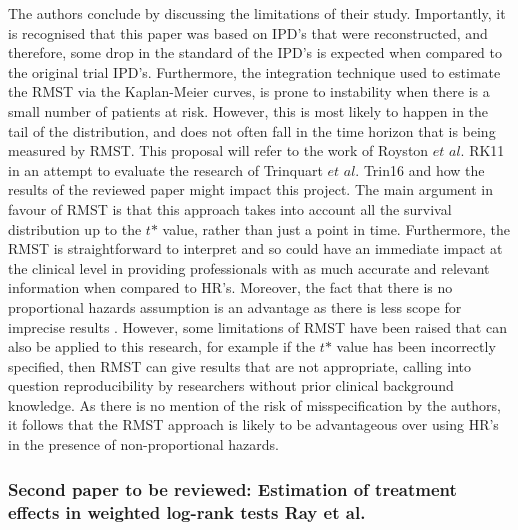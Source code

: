 \documentclass[12pt,twoside]{reedthesis}
\begin{document}
The authors conclude by discussing the limitations of their study. Importantly, it is recognised that this paper was based on IPD's that were reconstructed, and therefore, some drop in the standard of the IPD's is expected when compared to the original trial IPD's. Furthermore, the integration technique used to estimate the RMST via the Kaplan-Meier curves, is prone to instability when there is a small number of patients at risk. However, this is most likely to happen in the tail of the distribution, and does not often fall in the time horizon that is being measured by RMST.
This proposal will refer to the work of Royston \(\textit{et al.}\) RK11 in an attempt to evaluate the research of Trinquart \(\textit{et al.}\) Trin16 and how the results of the reviewed paper might impact this project. The main argument in favour of RMST is that this approach takes into account all the survival distribution up to the \(\textit{t*}\) value, rather than just a point in time. Furthermore, the RMST is straightforward to interpret and so could have an immediate impact at the clinical level in providing professionals with as much accurate and relevant information when compared to HR's. Moreover, the fact that there is no proportional hazards assumption is an advantage as there is less scope for imprecise results . However, some limitations of RMST have been raised that can also be applied to this research, for example if the \(\textit{t*}\) value has been incorrectly specified, then RMST can give results that are not appropriate, calling into question reproducibility by researchers without prior clinical background knowledge. As there is no mention of the risk of misspecification by the authors, it follows that the RMST approach is likely to be advantageous over using HR's in the presence of non-proportional hazards.

\hypertarget{second-paper-to-be-reviewed-estimation-of-treatment-effects-in-weighted-log-rank-tests-ray-et-al.}{%
\subsubsection{Second paper to be reviewed: Estimation of treatment effects in weighted log-rank tests Ray et al.}\label{second-paper-to-be-reviewed-estimation-of-treatment-effects-in-weighted-log-rank-tests-ray-et-al.}}
\end{document}
